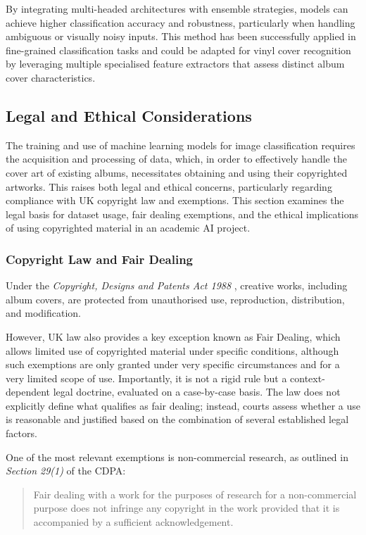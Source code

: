                 By integrating multi-headed architectures with ensemble strategies, models can achieve higher classification accuracy and robustness, particularly when handling ambiguous or visually noisy inputs. This method has been successfully applied in fine-grained classification tasks and could be adapted for vinyl cover recognition by leveraging multiple specialised feature extractors that assess distinct album cover characteristics.
    
        \subsection{Legal and Ethical Considerations}
    
          The training and use of machine learning models for image classification requires the acquisition and processing of data, which, in order to effectively handle the cover art of existing albums, necessitates obtaining and using their copyrighted artworks. This raises both legal and ethical concerns, particularly regarding compliance with UK copyright law and exemptions. This section examines the legal basis for dataset usage, fair dealing exemptions, and the ethical implications of using copyrighted material in an academic AI project.
    
              \subsubsection{Copyright Law and Fair Dealing}
                  Under the \textit{Copyright, Designs and Patents Act 1988} \cite{cdpa1988}, creative works, including album covers, are protected from unauthorised use, reproduction, distribution, and modification.
          
                  However, UK law also provides a key exception known as Fair Dealing, which allows limited use of copyrighted material under specific conditions, although such exemptions are only granted under very specific circumstances and for a very limited scope of use. Importantly, it is not a rigid rule but a context-dependent legal doctrine, evaluated on a case-by-case basis. The law does not explicitly define what qualifies as fair dealing; instead, courts assess whether a use is reasonable and justified based on the combination of several established legal factors.
                  
                  One of the most relevant exemptions is non-commercial research, as outlined in \textit{Section 29(1)} of the CDPA:
                  \begin{quote}
                      Fair dealing with a work for the purposes of research for a non-commercial purpose does not infringe any copyright in the work provided that it is accompanied by a sufficient acknowledgement. \cite{cdpa1988}
                  \end{quote}
    
